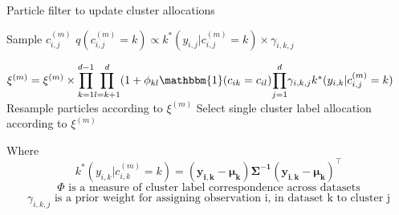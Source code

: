 \documentclass[10pt,a4paper]{article}
\begin{document}
\begin{algorithm}
\caption{Particle filter to update cluster allocations}
\label{alg:pf}
 \begin{algorithmic}[1]
   
   
   
  \State Sample $c^{(m)}_{i, j}$ 
  \State $q(c^{(m)}_{i,j} = k) \propto k^*(y_{i,j}|c_{i,j}^{(m)} = k) \times \gamma_{i, k, j}$ 

  \EndFor
    \State $\xi^{(m)} = \xi^{(m)} \times {\displaystyle\prod_{k = 1}^{d - 1}}{\displaystyle\prod_{l = k + 1}^{d}} (1+\phi_{kl} \mathbbm{1}(c_{ik} = c_{il}) {\displaystyle\prod_{j = 1}^{d}} \gamma_{i, k, j} k^*(y_{i,k}|c_{i,j}^{(m)} = k)$
  \EndFor
  \State Resample particles according to $\xi^{(m)}$
  \EndFor
  \State Select single cluster label allocation according to $\xi^{(m)}$

\end{algorithmic}
\end{algorithm}

Where
\begin{equation}
\label{eq:likelihood}
k^*(y_{i, k}|c_{i, k}^{(m)} = k) = (\mathbf{y_{i, k}} - \mathbf{\mu_k}) \mathbf{\Sigma^{-1}} (\mathbf{y_{i, k}} - \mathbf{\mu_k})^\top
\end{equation}
\begin{equation}
\label{eq:phi}
\Phi \text{ is a measure of cluster label correspondence across datasets}
\end{equation}
\begin{equation}
\label{eq:gamma}
\gamma_{i, k, j} \text{ is a prior weight for assigning observation i, in dataset k to cluster j}
\end{equation}
\end{document}
